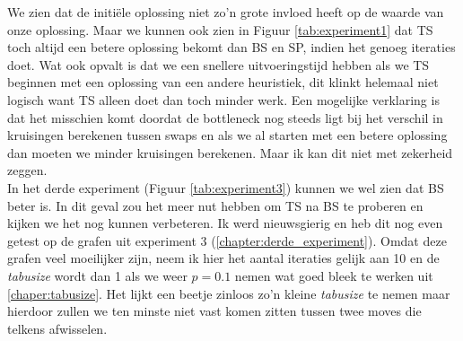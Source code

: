\documentclass[kulak]{kulakarticle} %
\begin{document}
\noindent We zien dat de initiële oplossing niet zo'n grote invloed heeft op de waarde van onze oplossing. Maar we kunnen ook zien in Figuur \ref{tab:experiment1} dat TS toch altijd een betere oplossing bekomt dan BS en SP, indien het genoeg iteraties doet. Wat ook opvalt is dat we een snellere uitvoeringstijd hebben als we TS beginnen met een oplossing van een andere heuristiek, dit klinkt helemaal niet logisch want TS alleen doet dan toch minder werk. Een mogelijke verklaring is dat het misschien komt doordat de bottleneck nog steeds ligt bij het verschil in kruisingen berekenen tussen swaps en als we al starten met een betere oplossing dan moeten we minder kruisingen berekenen. Maar ik kan dit niet met zekerheid zeggen. \\

\noindent In het derde experiment (Figuur \ref{tab:experiment3}) kunnen we wel zien dat BS beter is. In dit geval zou het meer nut hebben om TS na BS te proberen en kijken we het nog kunnen verbeteren. Ik werd nieuwsgierig en heb dit nog even getest op de grafen uit experiment 3 (\ref{chapter:derde_experiment}). Omdat deze grafen veel moeilijker zijn, neem ik hier het aantal iteraties gelijk aan 10 en de \textit{tabusize} wordt dan 1 als we weer $p=0.1$ nemen wat goed bleek te werken uit \ref{chaper:tabusize}. Het lijkt een beetje zinloos zo'n kleine \textit{tabusize} te nemen maar hierdoor zullen we ten minste niet vast komen zitten tussen twee moves die telkens afwisselen. \\

\begin{table}[h]
    \centering
    \caption{We kijken naar het effect van de start oplossing voor de grafen uit \ref{chapter:derde_experiment}.}
    \label{tab:start3}
\end{table}
\end{document}
